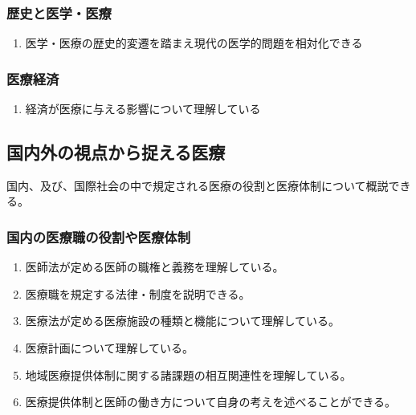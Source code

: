 \documentclass[
]{ltjsarticle}
\providecommand{\tightlist}{%
  \setlength{\itemsep}{0pt}\setlength{\parskip}{0pt}}
\begin{document}
\hypertarget{ux6b74ux53f2ux3068ux533bux5b66ux533bux7642}{%
\subsubsection{歴史と医学・医療}\label{ux6b74ux53f2ux3068ux533bux5b66ux533bux7642}}

\begin{enumerate}
\def\labelenumi{\arabic{enumi}.}
\tightlist
\item
  医学・医療の歴史的変遷を踏まえ現代の医学的問題を相対化できる
\end{enumerate}

\hypertarget{ux533bux7642ux7d4cux6e08}{%
\subsubsection{医療経済}\label{ux533bux7642ux7d4cux6e08}}

\begin{enumerate}
\def\labelenumi{\arabic{enumi}.}
\tightlist
\item
  経済が医療に与える影響について理解している
\end{enumerate}

\hypertarget{ux56fdux5185ux5916ux306eux8996ux70b9ux304bux3089ux6349ux3048ux308bux533bux7642}{%
\subsection{国内外の視点から捉える医療}\label{ux56fdux5185ux5916ux306eux8996ux70b9ux304bux3089ux6349ux3048ux308bux533bux7642}}

国内、及び、国際社会の中で規定される医療の役割と医療体制について概説できる。

\hypertarget{ux56fdux5185ux306eux533bux7642ux8077ux306eux5f79ux5272ux3084ux533bux7642ux4f53ux5236}{%
\subsubsection{国内の医療職の役割や医療体制}\label{ux56fdux5185ux306eux533bux7642ux8077ux306eux5f79ux5272ux3084ux533bux7642ux4f53ux5236}}

\begin{enumerate}
\def\labelenumi{\arabic{enumi}.}
\tightlist
\item
  医師法が定める医師の職権と義務を理解している。
\item
  医療職を規定する法律・制度を説明できる。
\item
  医療法が定める医療施設の種類と機能について理解している。
\item
  医療計画について理解している。
\item
  地域医療提供体制に関する諸課題の相互関連性を理解している。
\item
  医療提供体制と医師の働き方について自身の考えを述べることができる。
\end{enumerate}
\end{document}
